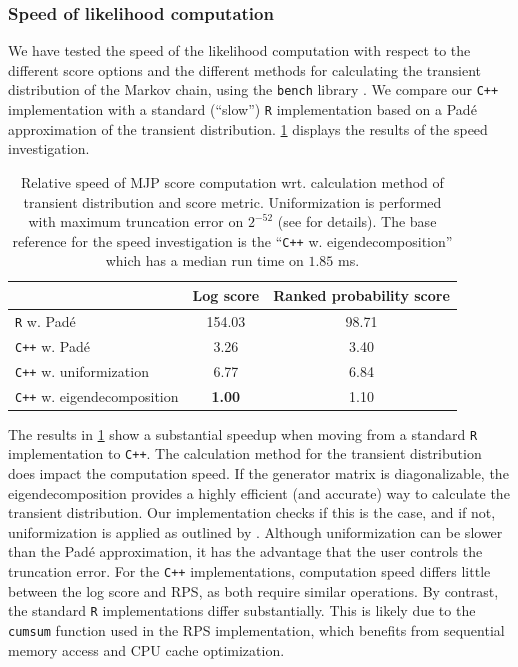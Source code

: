 \documentclass{article}
\begin{document}
\subsubsection{Speed of likelihood computation} We have tested the speed of the likelihood computation with respect to the different score options and the different methods for calculating the transient distribution of the Markov chain, using the \texttt{bench} library \citep{R_bench}. We compare our \texttt{C++} implementation with a standard (``slow'') \texttt{R} implementation based on a Padé approximation of the transient distribution. \cref{tab:mjp_score_computation_speed} displays the results of the speed investigation.
\begin{table}[htb!]
    \centering
    \caption{Relative speed of MJP score computation wrt. calculation method of transient distribution and score metric. Uniformization is performed with maximum truncation error on $2^{-52}$ (see \citet{sherlock2021a} for details). The base reference for the speed investigation is the ``\texttt{C++} w. eigendecomposition'' which has a median run time on $1.85$ ms.}
    \label{tab:mjp_score_computation_speed}
\begin{tabular}{lcc}
\toprule
  & Log score & Ranked probability score \\\midrule
\texttt{R} w. Padé & 154.03 & 98.71 \\\texttt{C++} w. Padé & 3.26 & 3.40 \\\texttt{C++} w. uniformization & 6.77 & 6.84 \\\texttt{C++} w. eigendecomposition & \textbf{1.00} & 1.10 \\\bottomrule
\end{tabular}
\end{table}
The results in \cref{tab:mjp_score_computation_speed} show a substantial speedup when moving from a standard \texttt{R} implementation to \texttt{C++}.
The calculation method for the transient distribution does impact the computation speed. If the generator matrix is diagonalizable, the eigendecomposition provides a highly efficient (and accurate) way to calculate the transient distribution. Our implementation checks if this is the case, and if not, uniformization is applied as outlined by \citet{sherlock2021a}. Although uniformization can be slower than the Padé approximation, it has the advantage that the user controls the truncation error. 
For the \texttt{C++} implementations, computation speed differs little between the log score and RPS, as both require similar operations. By contrast, the standard \texttt{R} implementations differ substantially. This is likely due to the \texttt{cumsum} function used in the RPS implementation, which benefits from sequential memory access and CPU cache optimization.
\end{document}
